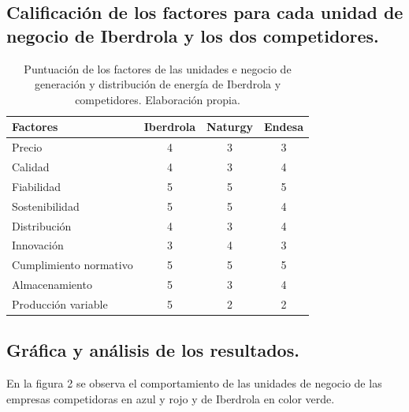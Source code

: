 \documentclass{article}
\begin{document}
\subsection{Calificación de los factores para cada unidad de negocio de Iberdrola y los dos competidores.}
\begin{table}[h]
    \centering
    \caption{Puntuación de los factores de las unidades e negocio de generación y distribución de energía de Iberdrola y competidores. Elaboración propia.}
    \begin{tabular}{|p{5cm}|c|c|c|}
        \hline
        \textbf{Factores} & \textbf{Iberdrola} & \textbf{Naturgy} & \textbf{Endesa} \\ \hline
        Precio           &   4                  & 3                      & 3                         \\ \hline
        Calidad       &     4                 &     3               & 4                        \\ \hline
        Fiabilidad           &    5                  &     5                 & 5                         \\ \hline
        Sostenibilidad    & 5                    & 5                      & 4                        \\ \hline
        Distribución        & 4                    & 3                       & 4                        \\ \hline
        Innovación            &  3                    &  4                     &   3                       \\ \hline
        Cumplimiento normativo        &   5                   & 5                     &  5                        \\ \hline
        Almacenamiento     &  5                    &  3                  &  4                        \\ \hline
        Producción variable   &  5                    &  2                 &  2                        \\ \hline
    \end{tabular}
    \label{tab:factores}
\end{table}

\subsection{Gráfica y análisis de los resultados.}
En la figura 2 se observa el comportamiento de las unidades de negocio de las empresas competidoras en azul y rojo y de Iberdrola en color verde. 
\\
\end{document}
